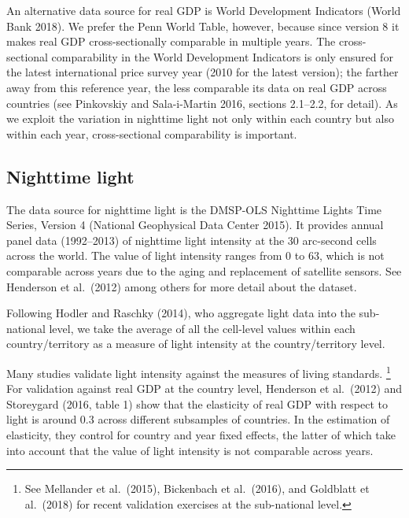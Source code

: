 \documentclass[12pt,a4paper]{article}%
\begin{document}
An alternative data source for real GDP is World Development Indicators (World Bank 2018). 
We prefer the Penn World Table, however, because since version 8 it makes real GDP cross-sectionally comparable in multiple years. 
The cross-sectional comparability in the World Development Indicators is only ensured for the latest international price survey year (2010 for the latest version); the farther away from this reference year, the less comparable its data on real GDP across countries (see Pinkovskiy and Sala-i-Martin 2016, sections 2.1--2.2, for detail).
As we exploit the variation in nighttime light not only within each country but also within each year, cross-sectional comparability is important.

\subsection{Nighttime light}
The data source for nighttime light is the DMSP-OLS Nighttime Lights Time Series, Version 4 (National Geophysical Data Center 2015). 
It provides annual panel data (1992--2013) of nighttime light intensity at the 30 arc-second cells across the world. 
The value of light intensity ranges from 0 to 63, which is not comparable across years due to the aging and replacement of satellite sensors. 
See Henderson et al.\ (2012) among others for more detail about the dataset.

Following Hodler and Raschky (2014), who aggregate light data into the sub-national level, we take the average of all the cell-level values within each country/territory as a measure of light intensity at the country/territory level.

Many studies validate light intensity against the measures of living standards.%
\footnote{See Mellander et al.\ (2015), Bickenbach et al.\ (2016), and Goldblatt et al.\ (2018) for recent validation exercises at the sub-national level.} 
For validation against real GDP at the country level, Henderson et al.\ (2012) and Storeygard (2016, table 1) show that the elasticity of real GDP with respect to light is around 0.3 across different subsamples of countries. 
In the estimation of elasticity, they control for country and year fixed effects, the latter of which take into account that the value of light intensity is not comparable across years.
\end{document}
